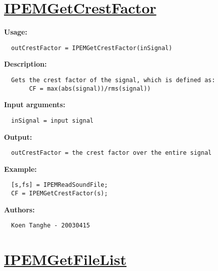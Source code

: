 \newpage
\section*{\hyperlink{Concepts:IPEMGetCrestFactor}{IPEMGetCrestFactor}}
\hypertarget{FuncRef:IPEMGetCrestFactor}{}

\textbf{Usage:}
\begin{verbatim}  outCrestFactor = IPEMGetCrestFactor(inSignal)

\end{verbatim}
\textbf{Description:}
\begin{verbatim}  Gets the crest factor of the signal, which is defined as:
       CF = max(abs(signal))/rms(signal))

\end{verbatim}
\textbf{Input arguments:}
\begin{verbatim}  inSignal = input signal

\end{verbatim}
\textbf{Output:}
\begin{verbatim}  outCrestFactor = the crest factor over the entire signal

\end{verbatim}
\textbf{Example:}
\begin{verbatim}  [s,fs] = IPEMReadSoundFile;
  CF = IPEMGetCrestFactor(s);

\end{verbatim}
\textbf{Authors:}
\begin{verbatim}  Koen Tanghe - 20030415
\end{verbatim}


\newpage
\section*{\hyperlink{Concepts:IPEMGetFileList}{IPEMGetFileList}}
\hypertarget{FuncRef:IPEMGetFileList}{}

